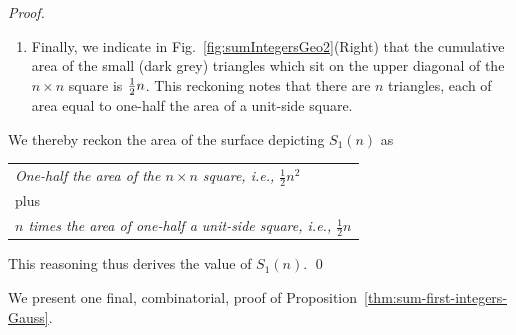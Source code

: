 \begin{proof}
\begin{enumerate}
\medskip\item
Finally, we indicate in Fig.~\ref{fig:sumIntegersGeo2}(Right) that the cumulative area of the small (dark grey) triangles which sit on the upper diagonal of the $n \times n$ square is ${1 \over 2} n$.  This reckoning notes that there are $n$ triangles, each of area equal to one-half the area of a unit-side square.
\end{enumerate}
We thereby reckon the area of the surface depicting $S_1(n)$ as

\begin{tabular}{l}
{\it One-half the area of the $n \times n$ square,
i.e., $\frac{1}{2} n^2$} \\
\hspace*{.15in} plus   \\
{\it $n$ times the area of one-half a unit-side square,
i.e., $\frac{1}{2} n$}
\end{tabular}

\smallskip

\noindent
This reasoning thus derives the value of $S_1(n)$.  \qed
\end{proof}

\medskip

We present one final, combinatorial, proof of Proposition~\ref{thm:sum-first-integers-Gauss}.

